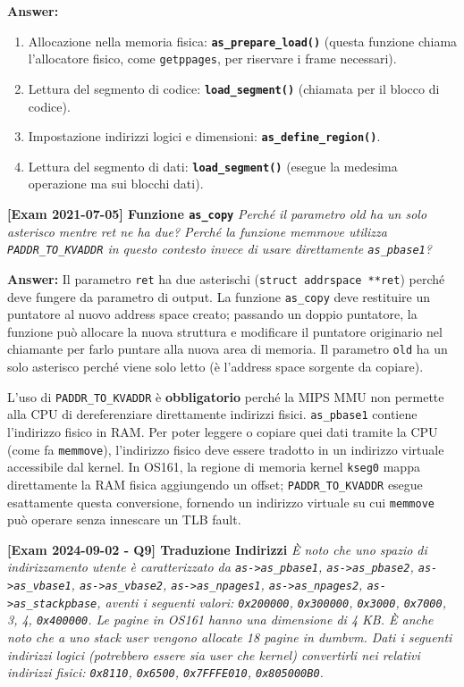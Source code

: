 \textbf{Answer:}
\begin{enumerate}
    \item Allocazione nella memoria fisica: \textbf{\texttt{as\_prepare\_load()}} (questa funzione chiama l'allocatore fisico, come \texttt{getppages}, per riservare i frame necessari).
    \item Lettura del segmento di codice: \textbf{\texttt{load\_segment()}} (chiamata per il blocco di codice).
    \item Impostazione indirizzi logici e dimensioni: \textbf{\texttt{as\_define\_region()}}.
    \item Lettura del segmento di dati: \textbf{\texttt{load\_segment()}} (esegue la medesima operazione ma sui blocchi dati).
\end{enumerate}

\vspace{1em}

\textbf{[Exam 2021-07-05] Funzione \texttt{as\_copy}}
\textit{Perché il parametro old ha un solo asterisco mentre ret ne ha due? Perché la funzione memmove utilizza \texttt{PADDR\_TO\_KVADDR} in questo contesto invece di usare direttamente \texttt{as\_pbase1}?}

\textbf{Answer:}
Il parametro \texttt{ret} ha due asterischi (\texttt{struct addrspace **ret}) perché deve fungere da parametro di output. La funzione \texttt{as\_copy} deve restituire un puntatore al nuovo address space creato; passando un doppio puntatore, la funzione può allocare la nuova struttura e modificare il puntatore originario nel chiamante per farlo puntare alla nuova area di memoria. Il parametro \texttt{old} ha un solo asterisco perché viene solo letto (è l'address space sorgente da copiare).

L'uso di \texttt{PADDR\_TO\_KVADDR} è \textbf{obbligatorio} perché la MIPS MMU non permette alla CPU di dereferenziare direttamente indirizzi fisici. \texttt{as\_pbase1} contiene l'indirizzo fisico in RAM. Per poter leggere o copiare quei dati tramite la CPU (come fa \texttt{memmove}), l'indirizzo fisico deve essere tradotto in un indirizzo virtuale accessibile dal kernel. In OS161, la regione di memoria kernel \texttt{kseg0} mappa direttamente la RAM fisica aggiungendo un offset; \texttt{PADDR\_TO\_KVADDR} esegue esattamente questa conversione, fornendo un indirizzo virtuale su cui \texttt{memmove} può operare senza innescare un TLB fault.

\vspace{1em}

\textbf{[Exam 2024-09-02 - Q9] Traduzione Indirizzi}
\textit{È noto che uno spazio di indirizzamento utente è caratterizzato da \texttt{as->as\_pbase1}, \texttt{as->as\_pbase2}, \texttt{as->as\_vbase1}, \texttt{as->as\_vbase2}, \texttt{as->as\_npages1}, \texttt{as->as\_npages2}, \texttt{as->as\_stackpbase}, aventi i seguenti valori: \texttt{0x200000}, \texttt{0x300000}, \texttt{0x3000}, \texttt{0x7000}, 3, 4, \texttt{0x400000}. Le pagine in OS161 hanno una dimensione di 4 KB. È anche noto che a uno stack user vengono allocate 18 pagine in dumbvm. Dati i seguenti indirizzi logici (potrebbero essere sia user che kernel) convertirli nei relativi indirizzi fisici: \texttt{0x8110}, \texttt{0x6500}, \texttt{0x7FFFE010}, \texttt{0x805000B0}.}

